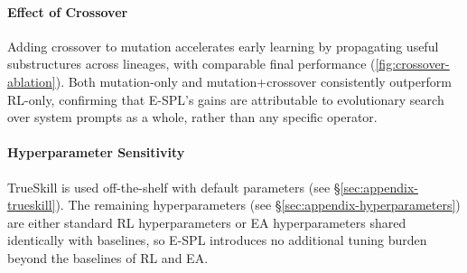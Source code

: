 \documentclass{article}
\theoremstyle{plain}
\theoremstyle{definition}
\theoremstyle{remark}
\begin{document}
\vspace{-5pt}
\paragraph{Effect of Crossover} Adding crossover to mutation accelerates early learning by propagating useful substructures across lineages, with comparable final performance (\autoref{fig:crossover-ablation}). Both mutation-only and mutation+crossover consistently outperform RL-only, confirming that E-SPL's gains are attributable to evolutionary search over system prompts as a whole, rather than any specific operator.

\vspace{-5pt}
\paragraph{Hyperparameter Sensitivity} TrueSkill is used off-the-shelf with default parameters (see \S\ref{sec:appendix-trueskill}). The remaining hyperparameters (see \S\ref{sec:appendix-hyperparameters}) are either standard RL hyperparameters or EA hyperparameters shared identically with baselines, so E-SPL introduces no additional tuning burden beyond the baselines of RL and EA.
\end{document}
